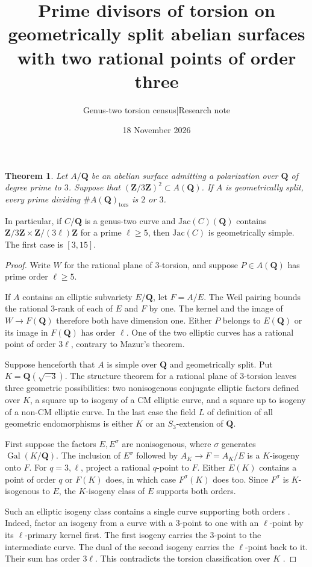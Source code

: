 \documentclass[11pt]{article}
\title{Prime divisors of torsion on geometrically split abelian surfaces with two rational points of order three}
\author{Genus-two torsion census\quad|\quad Research note}
\date{18 November 2026}
\newtheorem*{theorem}{Theorem}
\newcommand{\Q}{\mathbf Q}
\newcommand{\Z}{\mathbf Z}
\newcommand{\Gal}{\operatorname{Gal}}
\begin{document}
\maketitle
\begin{theorem}
Let $A/\Q$ be an abelian surface admitting a polarization over $\Q$ of degree prime to $3$. Suppose that $(\Z/3\Z)^2\subset A(\Q)$. If $A$ is geometrically split, every prime dividing $\#A(\Q)_{\mathrm{tors}}$ is $2$ or $3$.
\end{theorem}
In particular, if $C/\Q$ is a genus-two curve and $\mathrm{Jac}(C)(\Q)$ contains $\Z/3\Z\times\Z/(3\ell)\Z$ for a prime $\ell\ge5$, then $\mathrm{Jac}(C)$ is geometrically simple. The first case is $[3,15]$.

\begin{proof}
Write $W$ for the rational plane of $3$-torsion, and suppose $P\in A(\Q)$ has prime order $\ell\ge5$.

If $A$ contains an elliptic subvariety $E/\Q$, let $F=A/E$. The Weil pairing bounds the rational $3$-rank of each of $E$ and $F$ by one. The kernel and the image of $W\to F(\Q)$ therefore both have dimension one. Either $P$ belongs to $E(\Q)$ or its image in $F(\Q)$ has order $\ell$. One of the two elliptic curves has a rational point of order $3\ell$, contrary to Mazur's theorem.

Suppose henceforth that $A$ is simple over $\Q$ and geometrically split. Put $K=\Q(\sqrt{-3})$. The structure theorem for a rational plane of $3$-torsion \cite[Theorem 1(d)]{T3} leaves three geometric possibilities: two nonisogenous conjugate elliptic factors defined over $K$, a square up to isogeny of a CM elliptic curve, and a square up to isogeny of a non-CM elliptic curve. In the last case the field $L$ of definition of all geometric endomorphisms is either $K$ or an $S_3$-extension of $\Q$.

First suppose the factors $E,E^\sigma$ are nonisogenous, where $\sigma$ generates $\Gal(K/\Q)$. The inclusion of $E^\sigma$ followed by $A_K\to F=A_K/E$ is a $K$-isogeny onto $F$. For $q=3,\ell$, project a rational $q$-point to $F$. Either $E(K)$ contains a point of order $q$ or $F(K)$ does, in which case $F^\sigma(K)$ does too. Since $F^\sigma$ is $K$-isogenous to $E$, the $K$-isogeny class of $E$ supports both orders.

Such an elliptic isogeny class contains a single curve supporting both orders \cite[Lemma 1]{T45}. Indeed, factor an isogeny from a curve with a $3$-point to one with an $\ell$-point by its $\ell$-primary kernel first. The first isogeny carries the $3$-point to the intermediate curve. The dual of the second isogeny carries the $\ell$-point back to it. Their sum has order $3\ell$. This contradicts the torsion classification over $K$ \cite[Theorem 2(ii)]{Najman}.


\end{proof}
\end{document}
